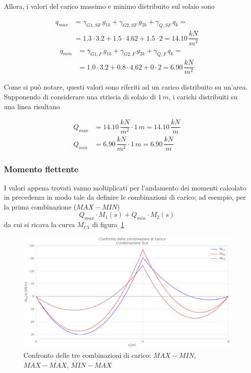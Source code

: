 Allora, i valori del carico massimo e minimo distribuito sul solaio sono

\begin{align*}
	q_{max} &= \gamma_{G1,SF}\,g_{1k} + \gamma_{G2,SF}\,g_{2k} + \gamma_{Q,SF}\,q_{k} =\\
	&= 1.3\cdot 3.2 + 1.5\cdot 4.62 + 1.5\cdot 2 = 14.10\,\dfrac{kN}{m^2}
\end{align*}
\begin{align*}
	q_{min} &= \gamma_{G1,F}\,g_{1k} + \gamma_{G2,F}\,g_{2k} + \gamma_{Q,F}\,q_{k} =\\
	&= 1.0\cdot 3.2 + 0.8\cdot 4.62 + 0\cdot 2 = 6.90\,\dfrac{kN}{m^2}
\end{align*}

Come si può notare, questi valori sono riferiti ad un carico distribuito su un'area. Supponendo di considerare una striscia di solaio di $1\,m$, i carichi distribuiti su una linea risultano

\begin{align*}
	Q_{max} &= 14.10\,\dfrac{kN}{m^2}\cdot 1\,m = 14.10\,\dfrac{kN}{m}\\
	Q_{min} &= 6.90\,\dfrac{kN}{m^2}\cdot 1\,m = 6.90\,\dfrac{kN}{m}
\end{align*}

\subsubsection*{Momento flettente}

I valori appena trovati vanno moltiplicati per l'andamento dei momenti calcolato in precedenza in modo tale da definire le combinazioni di carico; ad esempio, per la prima combinazione ($MAX-MIN$)
\[
	Q_{max}\cdot M_1(s) + Q_{min}\cdot M_2(s)
\]
da cui si ricava la curva $M_{C1}$ di figura~\ref{fig:bendingMomentComparison_solaio}

\begin{figure}
	\centering
	\includegraphics[width=\textwidth]{../../export/img/bendingMomentComparison_slu}
	\caption{Confronto delle tre combinazioni di carico: $MAX-MIN$, $MAX-MAX$, $MIN-MAX$}
    \label{fig:bendingMomentComparison_solaio}
\end{figure}

